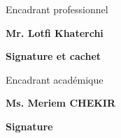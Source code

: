 \thispagestyle{empty}

\begin{center}
    \begin{minipage}[l]{1\columnwidth}
        \begin{tcolorbox}[colback=white,boxrule=2pt,arc=10pt,height=105mm]{
            \vspace{2cm}
            \vspace{1mm}
            \begin{center}
                \Large
                Encadrant professionnel
                
                \textbf{Mr. Lotfi Khaterchi}
            \end{center}
            \vspace{5mm}
            \hspace{0.68\columnwidth}\textbf{\large Signature et cachet}
        }
        \end{tcolorbox}
    \end{minipage}
    
    \vspace{2cm}
    
    \begin{minipage}[l]{1\columnwidth}
        \begin{tcolorbox}[colback=white,boxrule=2pt,arc=10pt,height=105mm]{
            \vspace{2cm}
            \large 
            \vspace{1mm}
            \begin{center}
                \Large
                Encadrant académique
                
                \textbf{Ms. Meriem CHEKIR}
            \end{center}
            \vspace{5mm}
            \hspace{0.84\columnwidth}\textbf{\large Signature}
        }
        \end{tcolorbox}
    \end{minipage}
\end{center}